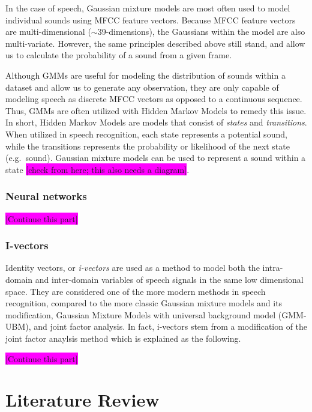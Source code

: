 \documentclass
[
    a4paper,
    twoside,
    12pt,
]
{report}
\begin{document}
In the case of speech, Gaussian mixture models are most often used to
model individual sounds using MFCC feature vectors. Because MFCC feature
vectors are multi-dimensional
(\begin{math} \sim \end{math}39-dimensions), the Gaussians within the
model are also multi-variate. However, the same principles described
above still stand, and allow us to calculate the probability of a sound
from a given frame.

Although GMMs are useful for modeling the distribution of sounds within
a dataset and allow us to generate any observation, they are only
capable of modeling speech as discrete MFCC vectors as opposed to a
continuous sequence. Thus, GMMs are often utilized with Hidden Markov
Models to remedy this issue. In short, Hidden Markov Models are models
that consist of \emph{states} and \emph{transitions}. When utilized in
speech recognition, each state represents a potential sound, while the
transitions represents the probability or likelihood of the next state
(e.g.~sound). Gaussian mixture models can be used to represent a sound
within a state
\colorbox{magenta}{[check from here; this also needs a diagram]}.

\subsection{Neural networks}

\colorbox{magenta}{[Continue this part]}

\subsection{I-vectors}

Identity vectors, or \emph{i-vectors} are used as a method to model both
the intra-domain and inter-domain variables of speech signals in the
same low dimensional space. They are considered one of the more modern
methods in speech recognition, compared to the more classic Gaussian
mixture models and its modification, Gaussian Mixture Models with
universal background model (GMM-UBM), and joint factor analysis. In
fact, i-vectors stem from a modification of the joint factor anaylsis
method which is explained as the following.

\colorbox{magenta}{[Continue this part]}
\chapter{Literature Review}
\end{document}
